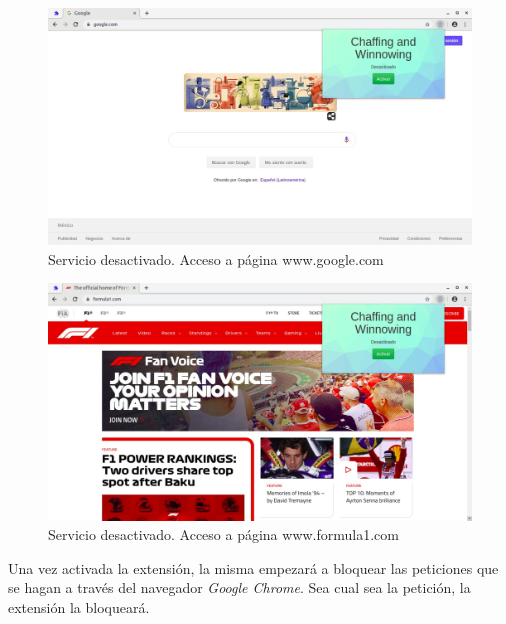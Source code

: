 \documentclass[12pt, a4paper, titlepage]{report}
\begin{document}
            \begin{figure}[H]
        		\begin{center}	\includegraphics[width=13cm]{./imagenes/Pruebas/Prototipo_1/P_desactivado1.jpeg}
        			\caption{Servicio desactivado. Acceso a página www.google.com}
        		\end{center}
        	\end{figure}
        	
        	\begin{figure}[H]
        		\begin{center}	\includegraphics[width=13cm]{./imagenes/Pruebas/Prototipo_1/P_desactivado2.jpeg}
        			\caption{Servicio desactivado. Acceso a página www.formula1.com}
        		\end{center}
        	\end{figure}
        	
        	Una vez activada la extensión, la misma empezará a bloquear las peticiones que se hagan a través del navegador \textit{Google Chrome}. Sea cual sea la petición, la extensión la bloqueará.
        	
\end{document}
